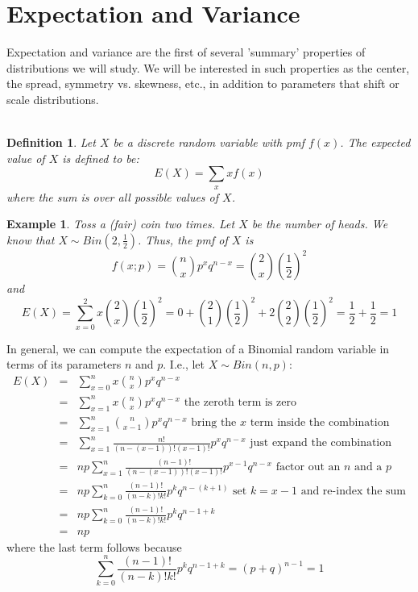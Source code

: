 \documentclass[12pt]{article} %
\newtheorem{defn}{Definition}
\newtheorem{example}{Example}
\begin{document}
\section{Expectation and Variance}
Expectation and variance are the first of several 'summary' properties of distributions we will study. We will be interested in such properties as the center, the spread, symmetry vs. skewness, etc., in addition to parameters that shift or scale distributions.\\\\
\begin{defn}
Let $X$ be a discrete random variable with pmf $f(x)$. The \emph{expected value} of $X$ is defined to be:
$$E(X) = \sum_x x f(x)$$
where the sum is over all possible values of $X$.
\end{defn}
\begin{example}
Toss a (fair) coin two times. Let $X$ be the number of heads. We know that $X\sim Bin(2,\frac12)$. Thus, the pmf of $X$ is
$$f(x;p) = {n\choose{x}}p^xq^{n-x} = {2\choose{x}}\left(\frac12\right)^2$$
and
$$E(X) = \sum_{x=0}^2 x {2\choose{x}}\left(\frac12\right)^2 = 0 + {2\choose{1}}\left(\frac12\right)^2 + 2{2\choose{2}}\left(\frac12\right)^2= \frac12 + \frac12 = 1$$
\end{example}
In general, we can compute the expectation of a Binomial random variable in terms of its parameters $n$ and $p$. I.e., let $X\sim Bin(n,p)$:
\begin{eqnarray*}
E(X) &=& \sum_{x=0}^n x {n\choose{x}}p^xq^{n-x}\\
&=& \sum_{x=1}^n x {n\choose{x}}p^xq^{n-x} \textrm{ the zeroth term is zero}\\
&=& \sum_{x=1}^n {n\choose{x-1}}p^xq^{n-x} \textrm{ bring the }x\textrm{ term inside the combination}\\
&=& \sum_{x=1}^n \frac{n!}{(n-(x-1))!(x-1)!}p^xq^{n-x} \textrm{ just expand the combination}\\
&=&np \sum_{x=1}^n \frac{(n-1)!}{(n-(x-1))!(x-1)!}p^{x-1}q^{n-x} \textrm{ factor out an }n \textrm{ and a } p\\
&=&np \sum_{k=0}^n \frac{(n-1)!}{(n-k)!k!}p^kq^{n-(k+1)} \textrm{ set }k=x-1\textrm{ and re-index the sum}\\
&=&np \sum_{k=0}^n \frac{(n-1)!}{(n-k)!k!}p^kq^{n-1+k}\\
&=& np
\end{eqnarray*}
where the last term follows because 
$$\sum_{k=0}^n \frac{(n-1)!}{(n-k)!k!}p^kq^{n-1+k} = (p+q)^{n-1} = 1$$
\end{document}
